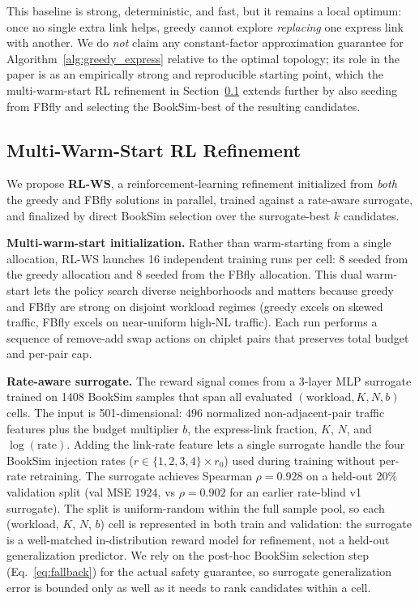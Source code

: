 \documentclass[conference]{IEEEtran}
\begin{document}
This baseline is strong, deterministic, and fast, but it remains a local optimum: once no single extra link helps, greedy cannot explore \textit{replacing} one express link with another. We do \textit{not} claim any constant-factor approximation guarantee for Algorithm~\ref{alg:greedy_express} relative to the optimal topology; its role in the paper is as an empirically strong and reproducible starting point, which the multi-warm-start RL refinement in Section~\ref{sec:rl_ws} extends further by also seeding from FBfly and selecting the BookSim-best of the resulting candidates.

\subsection{Multi-Warm-Start RL Refinement}
\label{sec:rl_ws}

We propose \textbf{RL-WS}, a reinforcement-learning refinement initialized from \textit{both} the greedy and FBfly solutions in parallel, trained against a rate-aware surrogate, and finalized by direct BookSim selection over the surrogate-best $k$ candidates.

\textbf{Multi-warm-start initialization.} Rather than warm-starting from a single allocation, RL-WS launches 16 independent training runs per cell: 8 seeded from the greedy allocation and 8 seeded from the FBfly allocation. This dual warm-start lets the policy search diverse neighborhoods and matters because greedy and FBfly are strong on disjoint workload regimes (greedy excels on skewed traffic, FBfly excels on near-uniform high-NL traffic). Each run performs a sequence of remove-add swap actions on chiplet pairs that preserves total budget and per-pair cap.

\textbf{Rate-aware surrogate.} The reward signal comes from a 3-layer MLP surrogate trained on 1408 BookSim samples that span all evaluated $(\text{workload}, K, N, b)$ cells. The input is 501-dimensional: 496 normalized non-adjacent-pair traffic features plus the budget multiplier $b$, the express-link fraction, $K$, $N$, and $\log(\text{rate})$. Adding the link-rate feature lets a single surrogate handle the four BookSim injection rates ($r\!\in\!\{1{,}2{,}3{,}4\}\times r_0$) used during training without per-rate retraining. The surrogate achieves Spearman $\rho{=}0.928$ on a held-out 20\% validation split (val MSE $1924$, vs $\rho{=}0.902$ for an earlier rate-blind v1 surrogate). The split is uniform-random within the full sample pool, so each (workload, $K$, $N$, $b$) cell is represented in both train and validation: the surrogate is a well-matched in-distribution reward model for refinement, not a held-out generalization predictor. We rely on the post-hoc BookSim selection step (Eq.~\ref{eq:fallback}) for the actual safety guarantee, so surrogate generalization error is bounded only as well as it needs to rank candidates within a cell.
\end{document}
